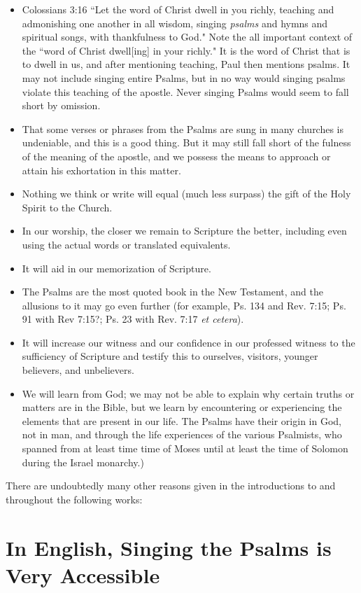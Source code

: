 \documentclass{article}
\begin{document}
\begin{itemize}
	\item Colossians 3:16 ``Let the word of Christ dwell in you richly, teaching and admonishing one another in all wisdom, singing \emph{psalms} and hymns and spiritual songs, with thankfulness to God." Note the all important context of the ``word of Christ dwell[ing] in your richly." It is the word of Christ that is to dwell in us, and after mentioning teaching, Paul then mentions psalms.  It may not include singing entire Psalms, but in no way would singing psalms violate this teaching of the apostle.  Never singing Psalms would seem to fall short by omission.
	\item That some verses or phrases from the Psalms are sung in many churches is undeniable, and this is a good thing.  But it may still fall short of the fulness of the meaning of the apostle, and we possess the means to approach or attain his exhortation in this matter.
	\item Nothing we think or write will equal (much less surpass) the gift of the Holy Spirit to the Church.
	\item In our worship, the closer we remain to Scripture the better, including even using the actual words or translated equivalents.
	\item It will aid in our memorization of Scripture.
	\item The Psalms are the most quoted book in the New Testament, and the allusions to it may go even further (for example, Ps. 134 and Rev. 7:15; Ps. 91 with Rev 7:15?; Ps. 23 with Rev. 7:17 \emph{et cetera}).
	\item It will increase our witness and our confidence in our professed witness to the sufficiency of Scripture and testify this to ourselves, visitors, younger believers, and unbelievers.  
	\item We will learn from God; we may not be able to explain why certain truths or matters are in the Bible, but we learn by encountering or experiencing the elements that are present in our life.  The Psalms have their origin in God, not in man, and through the life experiences of the various Psalmists, who spanned from at least time time of Moses until at least the time of Solomon during the Israel monarchy.)
\end{itemize}


There are undoubtedly many other reasons given in the introductions to and throughout the following works:

\section{In English, Singing the Psalms is Very Accessible}
\end{document}
